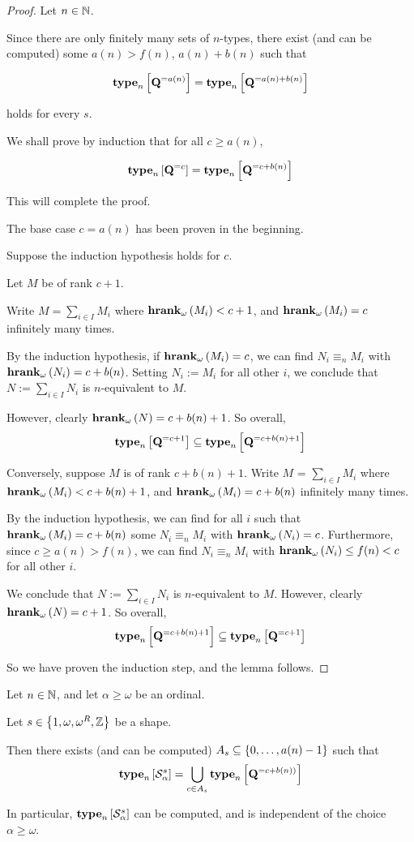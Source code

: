 \begin{proof}
  Let $n \in \mathbb{N}$.

  Since there are only finitely many sets of $n$-types,
  there exist (and can be computed)
  some $a(n) > f(n)$, $a(n) + b(n)$ such that

  $$\mathbf{type}_{n} \left[ {\mathbf{Q}^{= a(n)}} \right] = \mathbf{type}_{n} \left[ {\mathbf{Q}^{= a(n) + b(n)}} \right]$$

  holds for every $s$.

  We shall prove by induction that for all $c \ge a(n)$,

  $$\mathbf{type}_{n} \left[ {\mathbf{Q}^{= c}} \right] = \mathbf{type}_{n} \left[ {\mathbf{Q}^{= c + b(n)}} \right]$$

  This will complete the proof.

  The base case $c = a(n)$ has been proven in the beginning.

  Suppose the induction hypothesis holds for $c$.

  Let $M$ be of rank $c + 1$.

  Write $M = \sum_{i \in I} M_i$ where $\mathbf{hrank}_{\omega}\left( M_i \right) < c + 1$,
  and $\mathbf{hrank}_{\omega}\left( M_i \right) = c$ infinitely many times.

  By the induction hypothesis,
  if $\mathbf{hrank}_{\omega}\left( M_i \right) = c$, we can find $N_i \equiv_n M_i$ with $\mathbf{hrank}_{\omega}\left( N_i \right) = c + b(n)$.
  Setting $N_i := M_i$ for all other $i$, we conclude that $N := \sum_{i \in I} N_i$
  is $n$-equivalent to $M$.

  However, clearly $\mathbf{hrank}_{\omega}\left( N \right) = c + b(n) + 1$. So overall,
  $$\mathbf{type}_{n} \left[ {\mathbf{Q}^{= c + 1}} \right] \subseteq \mathbf{type}_{n} \left[ {\mathbf{Q}^{= c + b(n) + 1}} \right]$$

  Conversely, suppose $M$ is of rank $c + b(n) + 1$.
  Write $M$ = $\sum_{i \in I} M_i$ where $\mathbf{hrank}_{\omega}\left( M_i \right) < c + b(n) + 1$,
  and $\mathbf{hrank}_{\omega}\left( M_i \right) = c + b(n)$ infinitely many times.

  By the induction hypothesis,
  we can find for all $i$ such that $\mathbf{hrank}_{\omega}\left( M_i \right) = c + b(n)$ some
  $N_i \equiv_n M_i$ with $\mathbf{hrank}_{\omega}\left( N_i \right) = c$.
  Furthermore, since $c \ge a(n) > f(n)$, we can
  find $N_i \equiv_n M_i$ with $\mathbf{hrank}_{\omega}\left( N_i \right) \le f(n) < c$ for all other $i$.

  We conclude that $N := \sum_{i \in I} N_i$ is $n$-equivalent to $M$.
  However, clearly $\mathbf{hrank}_{\omega}\left( N \right) = c + 1$. So overall,
  $$\mathbf{type}_{n} \left[ {\mathbf{Q}^{= c + b(n) + 1}} \right] \subseteq \mathbf{type}_{n} \left[ {\mathbf{Q}^{= c + 1}} \right]$$

  So we have proven the induction step, and the lemma follows.
\end{proof}

\begin{lemma}
  Let $n \in \mathbb{N}$, and let $\alpha \ge \omega$ be an ordinal.

  Let $s \in \left\{ {1, \omega, \omega^R, \mathbb{Z}} \right\}$ be a shape.

  Then there exists (and can be computed) $A_s \subseteq \left\{ {0, \ldots, a(n) - 1} \right\}$ such that
  $$\mathbf{type}_{n} \left[ {\mathcal{S}^s_{\alpha}} \right] = \bigcup_{c \in A_s}{\mathbf{type}_{n} \left[ {\mathbf{Q}^{= c + b(n))}} \right]}$$

  In particular, $\mathbf{type}_{n} \left[ {\mathcal{S}^s_{\alpha}} \right]$ can be
  computed, and is independent of the choice $\alpha \ge \omega$.
\end{lemma}

